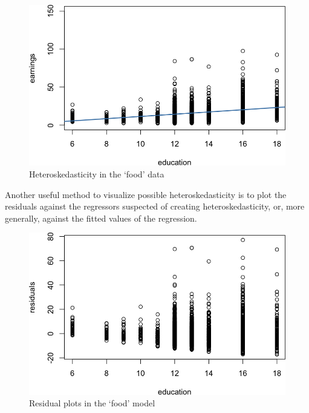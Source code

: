 \documentclass[]{book}
\newenvironment{Shaded}{\begin{snugshade}}{\end{snugshade}}
\newcommand{\DataTypeTok}[1]{\textcolor[rgb]{0.13,0.29,0.53}{#1}}
\newcommand{\KeywordTok}[1]{\textcolor[rgb]{0.13,0.29,0.53}{\textbf{#1}}}
\newcommand{\NormalTok}[1]{#1}
\newcommand{\OperatorTok}[1]{\textcolor[rgb]{0.81,0.36,0.00}{\textbf{#1}}}
\newcommand{\StringTok}[1]{\textcolor[rgb]{0.31,0.60,0.02}{#1}}
\begin{document}
\begin{figure}

{\centering \includegraphics[width=0.8\linewidth]{MEM5220_R_files/figure-latex/fig18-1} 

}

\caption{Heteroskedasticity in the ‘food’ data}\label{fig:fig18}
\end{figure}

Another useful method to visualize possible heteroskedasticity is to plot the residuals against the regressors suspected of creating heteroskedasticity, or, more generally, against the fitted values of the regression.

\begin{Shaded}
\end{Shaded}

\begin{figure}

{\centering \includegraphics[width=0.8\linewidth]{MEM5220_R_files/figure-latex/fig19-1} 

}

\caption{Residual plots in the ‘food’ model }\label{fig:fig191}
\end{figure}
\end{document}

